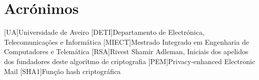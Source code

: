 \documentclass{report}
\begin{document}
\chapter*{Acrónimos}
\begin{acronym}
 [UA]{Universidade de Aveiro}
 [DETI]{Departamento de Electrónica, Telecomunicações e Informática}
 [MIECT]{Mestrado Integrado em Engenharia de Computadores e Telemática}
 [RSA]{Rivest Shamir Adleman, Iniciais dos apelidos dos fundadores deste algorítmo de criptografia}
 [PEM]{Privacy-enhanced Electronic Mail}
 [SHA1]{Função hash criptográfica}
\end{acronym}


%
\end{document}
